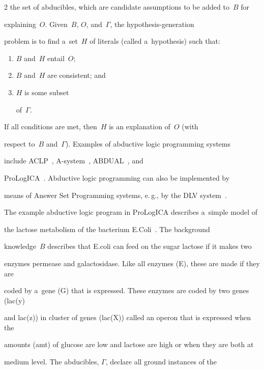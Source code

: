 \begin{multicols}{2}
the set of abducibles, which are candidate assumptions to be added to~$B$ for


explaining~$O$. Given~$B$, $O$, and~$\Gamma$, the hypothesis-generation


problem is to find a~set~$H$ of literals (called a~hypothesis) such that:


\begin{enumerate}[(1)]


\item $B$ and~$H$ entail~$O$;


\item $B$ and~$H$ are consistent; and


\item $H$ is some subset


of~$\Gamma$.


\end{enumerate}


  If all conditions are met, then~$H$ is an explanation of~$O$ (with


respect to~$B$ and~$\Gamma$).  Examples of abductive logic programming systems


include ACLP~\cite{18-kl}, A-system~\cite{19-kl}, ABDUAL~\cite{20-kl}, and


ProLogICA~\cite{21-kl}. Abductive logic programming can also be implemented by


means of Answer Set Programming systems, e.\,g., by the DLV system~\cite{22-kl}.





  The example abductive logic program in ProLogICA describes a~simple model of


the lactose metabolism of the bacterium E.Coli~\cite{21-kl}. The background


knowledge~$B$ describes that E.coli can feed on the sugar lactose if it makes two


enzymes permease and galactosidase. Like all enzymes (E), these are made if they are


coded by a~gene (G) that is expressed. These enzymes are coded by two genes (lac(y)


and lac(z)) in cluster of genes (lac(X)) called an operon that is expressed when the


amounts (amt) of glucose are low and lactose are high or when they are both at


medium level. The abducibles, $\Gamma$, declare all ground instances of the



\end{multicols}
